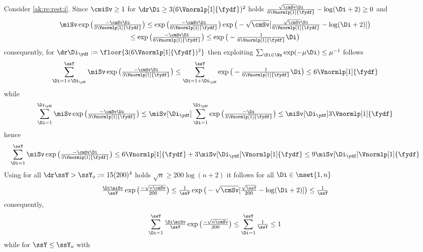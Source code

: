 \begin{pro}Consider \ref{ak:re:rest:i}.
  Since $\cmiSv\geq1$ for
  $\dr\Di\geq3({6\Vnormlp[1]{\fydf}})^2$ holds
  $\tfrac{\sqrt{\cmSv}\Di}{6\Vnormlp[1]{\fydf}}-\log(\Di+2)\geq0$
  and%
  \begin{multline*}
    \miSv\exp\big(\tfrac{-\cmSv\Di}{3\Vnormlp[1]{\fydf}}\big)\leq
    \exp\big(\tfrac{-\cmSv\Di}{6\Vnormlp[1]{\fydf}}\big)
    \exp\big(-\sqrt{\cmSv}[\tfrac{\sqrt{\cmSv}\Di}{6\Vnormlp[1]{\fydf}}-\log(\Di+2)]\big)\\
    \leq\exp\big(\tfrac{-\cmSv\Di}{6\Vnormlp[1]{\fydf}}\big)
    \leq\exp\big(-\tfrac{1}{6\Vnormlp[1]{\fydf}}\Di\big)
  \end{multline*}
  consequently, for
  $\dr\Di_{\ydf}:=\floor{3({6\Vnormlp[1]{\fydf}})^2}$ then exploiting
  $\sum_{\Di\in\Nz}\exp(-\mu\Di)\leq \mu^{-1}$ follows
  \begin{displaymath}
    \sum_{\Di=1+\Di_{\ydf}}^{\ssY}\miSv\exp\big(\tfrac{-\cmSv\Di}{3\Vnormlp[1]{\fydf}}\big)\leq
    \sum_{\Di=1+\Di_{\ydf}}^{\ssY}\exp\big(-\tfrac{1}{6\Vnormlp[1]{\fydf}}\Di\big)
    \leq {6\Vnormlp[1]{\fydf}}
  \end{displaymath}
  while
  \begin{displaymath}
   \sum_{\Di=1}^{\Di_{\ydf}}\miSv\exp\big(\tfrac{-\cmSv\Di}{3\Vnormlp[1]{\fydf}}\big)\leq
   \miSv[\Di_{\ydf}]\sum_{\Di=1}^{\Di_{\ydf}}\exp\big(\tfrac{-\Di}{3\Vnormlp[1]{\fydf}}\big)
   \leq \miSv[\Di_{\ydf}]{3\Vnormlp[1]{\fydf}}
 \end{displaymath}
 hence
 \begin{displaymath}
   \sum_{\Di=1}^{\ssY}\miSv\exp\big(\tfrac{-\cmSv\Di}{3\Vnormlp[1]{\fydf}}\big)\leq
   {6\Vnormlp[1]{\fydf}}+3\miSv[\Di_{\ydf}]\Vnormlp[1]{\fydf}\leq 9\miSv[\Di_{\ydf}]{\Vnormlp[1]{\fydf}}
 \end{displaymath}
 Using for all $\dr \ssY>\ssY_{o}:=15({200})^4$ holds 
 $\sqrt{n}\geq{200}\log(n+2)$ it follows for all $\Di\in\nset{1,n}$
 \begin{displaymath}
   \tfrac{\Di\miSv}{\ssY}\exp\big(\tfrac{-\sqrt{n\cmSv}}{200}\big)
   \leq
   \tfrac{1}{\ssY}\exp\big(-\sqrt{\cmSv}[\tfrac{\sqrt{\ssY}}{200}-\log(\Di+2)]\big)\leq \tfrac{1}{\ssY}
 \end{displaymath}
 consequently, 
 \begin{equation*}
   \sum_{\Di=1}^{\ssY}\tfrac{\Di\miSv}{\ssY}\exp\big(\tfrac{-\sqrt{n\cmSv}}{200}\big)
   \leq\sum_{\Di=1}^{\ssY}\tfrac{1}{\ssY}\leq1
 \end{equation*}
 while for $\ssY\leq \ssY_{o}$ with

\end{pro}
